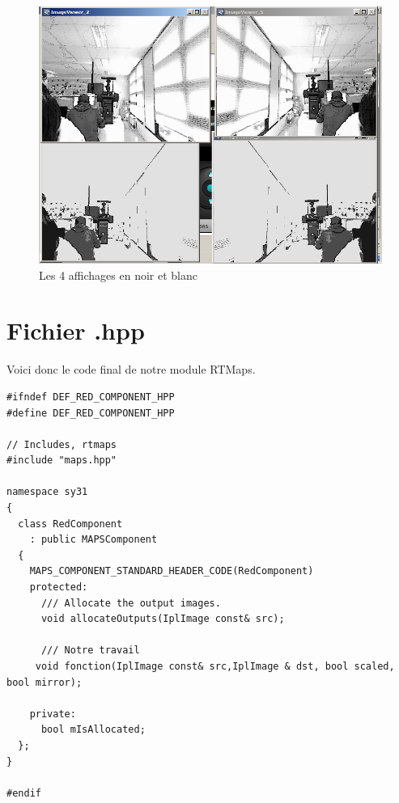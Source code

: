 \begin{figure}[!h]
   \centering\includegraphics[width=1.0\textwidth]{pictures/noir_et_blanc.png}
   \caption{Les 4 affichages en noir et blanc}
\end{figure}

\section{Fichier .hpp}

Voici donc le code final de notre module RTMaps.
\begin{lstlisting}
#ifndef DEF_RED_COMPONENT_HPP
#define DEF_RED_COMPONENT_HPP

// Includes, rtmaps
#include "maps.hpp"

namespace sy31
{
  class RedComponent
    : public MAPSComponent
  {
    MAPS_COMPONENT_STANDARD_HEADER_CODE(RedComponent)
    protected:
      /// Allocate the output images.
      void allocateOutputs(IplImage const& src);

      /// Notre travail
     void fonction(IplImage const& src,IplImage & dst, bool scaled, bool mirror);

    private:
      bool mIsAllocated;
  };
}

#endif
\end{lstlisting}

